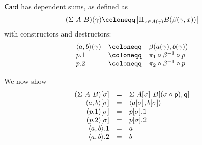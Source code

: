 


\(\mathsf{Card}\) has dependent sums, as defined as
\[
  (\Sigma\ A\ B)(\gamma) \coloneqq
  \card{\amalg_{x \in A(\gamma)} B(\beta(\gamma,x))}
\]
with constructors and destructors:
\[
  \begin{array}{lcl}
    \dpair{a,b}(\gamma) &\coloneqq& \beta(a(\gamma), b(\gamma)) \\
    p.1 &\coloneqq& \pi_1 \circ \beta^{-1} \circ p \\
    p.2 &\coloneqq& \pi_2 \circ \beta^{-1} \circ p
  \end{array}
\]

We now show
\[
  \begin{array}{rcl}
    (\Sigma\ A\ B)[\sigma] &=& \Sigma\ A[\sigma]\ B[(\sigma \circ \mathsf{p}), \mathsf{q}] \\
    \langle a,b \rangle[\sigma] &=& \langle a[\sigma], b[\sigma] \rangle \\
    (p.1)[\sigma] &=& p[\sigma].1 \\
    (p.2)[\sigma] &=& p[\sigma].2 \\
    \langle a,b \rangle.1 &=& a \\
    \langle a,b \rangle.2 &=& b
  \end{array}
\]


